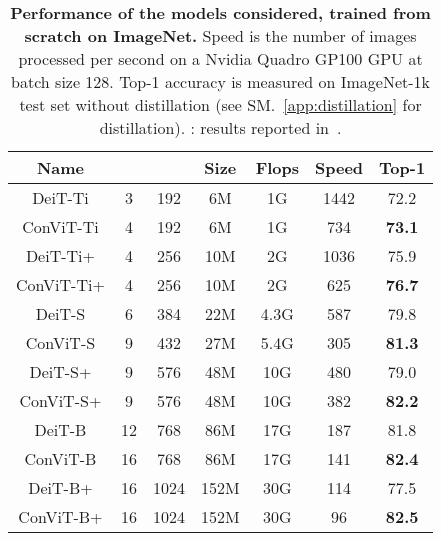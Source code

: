 \documentclass[a4paper,11pt,twocolumn]{article}
\begin{document}
\begin{table}[tb]
    \footnotesize
    \centering
    \begin{tabular}{c|c|c|c|c|c|c}
    \toprule
    \textbf{Name} &  &  & Size & Flops & Speed & Top-1\\
    \midrule
    DeiT-Ti & 3 & 192 & 6M & 1G & 1442 & 72.2\\
    ConViT-Ti       & 4 & 192 & 6M & 1G & 734 & \textbf{73.1} \\
    \hline
    DeiT-Ti+   & 4 & 256 & 10M & 2G & 1036 & 75.9  \\
    ConViT-Ti+ & 4 & 256 & 10M & 2G & 625 & \textbf{76.7} \\
    \hline
    DeiT-S & 6 & 384 & 22M & 4.3G & 587  & 79.8 \\
    ConViT-S       & 9 & 432 & 27M & 5.4G & 305 & \textbf{81.3}\\
    \hline
    DeiT-S+   & 9 & 576 & 48M & 10G & 480 & 79.0 \\
    ConViT-S+ & 9 & 576 & 48M & 10G & 382 & \textbf{82.2} \\
    \hline
    DeiT-B & 12 & 768 & 86M & 17G & 187 & 81.8\\
    ConViT-B       & 16 & 768 & 86M & 17G & 141 & \textbf{82.4}\\
    \hline
    DeiT-B+   & 16 & 1024 & 152M & 30G & 114 & 77.5 \\
    ConViT-B+ & 16 & 1024 & 152M & 30G & 96 & \textbf{82.5} \\
    \bottomrule
    \end{tabular}
    \caption{\textbf{Performance of the models considered, trained from scratch on ImageNet.} Speed is the number of images processed per second on a Nvidia Quadro GP100 GPU at batch size 128. Top-1 accuracy is measured on ImageNet-1k test set without distillation (see SM.~\ref{app:distillation} for distillation). : results reported in~\cite{touvron2020training}.
    }
    \label{tab:statistics}
\end{table}
\end{document}

